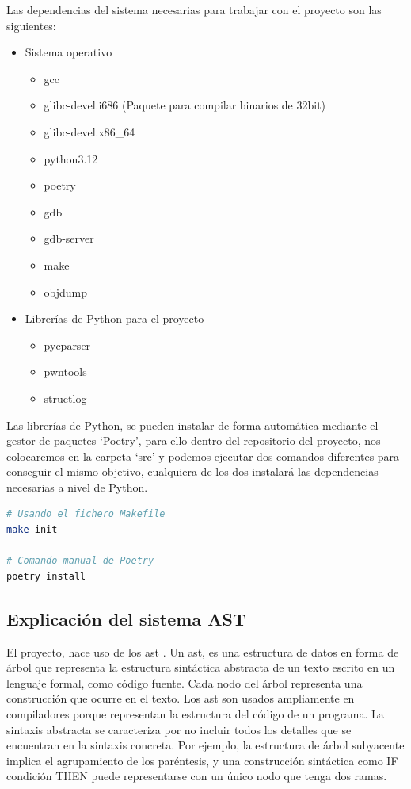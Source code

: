 Las dependencias del sistema necesarias para trabajar con el proyecto son las siguientes:
\begin{itemize}
    \item Sistema operativo
    \begin{itemize}
        \item \acrshort{gcc}
        \item glibc-devel.i686 (Paquete para compilar binarios de 32bit)
        \item glibc-devel.x86\_64
        \item python3.12
        \item poetry \cite{poetry-install}
        \item gdb
        \item gdb-server
        \item make
        \item objdump
    \end{itemize}
    \item Librerías de Python para el proyecto
    \begin{itemize}
        \item pycparser \cite{pycparser}
        \item pwntools \cite{pwntools}
        \item structlog \cite{structlog}
    \end{itemize}
\end{itemize}

Las librerías de Python, se pueden instalar de forma automática mediante el gestor de paquetes `Poetry', para ello dentro del repositorio del proyecto, nos colocaremos en la carpeta `src' y podemos ejecutar dos comandos diferentes para conseguir el mismo objetivo, cualquiera de los dos instalará las dependencias necesarias a nivel de Python.

\begin{lstlisting}[language=bash]
# Usando el fichero Makefile
make init

# Comando manual de Poetry
poetry install
\end{lstlisting}

\subsection{Explicación del sistema AST}
El proyecto, hace uso de los \acrfull{ast} \cite{ast}. Un \acrshort{ast}, es una estructura de datos en forma de árbol que representa la estructura sintáctica abstracta de un texto escrito en un lenguaje formal, como código fuente. Cada nodo del árbol representa una construcción que ocurre en el texto. Los \acrshort{ast} son usados ampliamente en compiladores porque representan la estructura del código de un programa. La sintaxis abstracta se caracteriza por no incluir todos los detalles que se encuentran en la sintaxis concreta. Por ejemplo, la estructura de árbol subyacente implica el agrupamiento de los paréntesis, y una construcción sintáctica como IF condición THEN puede representarse con un único nodo que tenga dos ramas.

